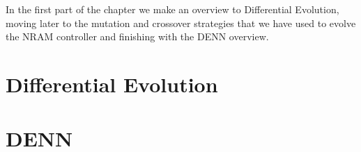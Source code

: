 \label{chap:differential-evolution}
In the first part of the chapter we make an overview to Differential Evolution, moving later to the mutation and crossover strategies that we have used to evolve the NRAM controller and finishing with the DENN overview.

\section{Differential Evolution}

\section{DENN}